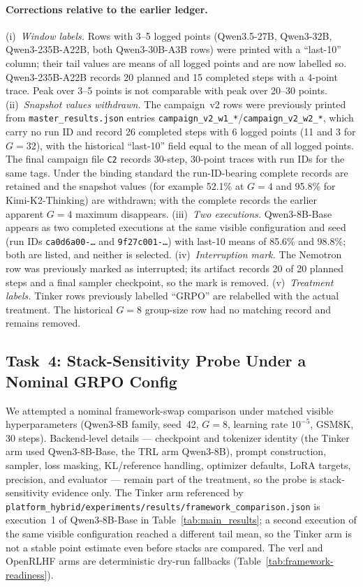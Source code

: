 \documentclass{article}
\begin{document}
\paragraph{Corrections relative to the earlier ledger.}
(i)~\emph{Window labels.} Rows with 3--5 logged points (Qwen3.5-27B,
Qwen3-32B, Qwen3-235B-A22B, both Qwen3-30B-A3B rows) were printed with a
``last-10'' column; their tail values are means of all logged points and are
now labelled so. Qwen3-235B-A22B records 20 planned and 15 completed steps
with a 4-point trace. Peak over 3--5 points is not comparable with peak over
20--30 points. (ii)~\emph{Snapshot values withdrawn.} The campaign~v2 rows were
previously printed from \texttt{master\_results.json} entries
\texttt{campaign\_v2\_w1\_*}/\texttt{campaign\_v2\_w2\_*}, which carry no run
ID and record 26 completed steps with 6 logged points (11 and 3 for $G=32$),
with the historical ``last-10'' field equal to the mean of all logged points.
The final campaign file \texttt{C2} records 30-step, 30-point traces with run
IDs for the same tags. Under the binding standard the run-ID-bearing complete
records are retained and the snapshot values (for example 52.1\% at $G=4$ and
95.8\% for Kimi-K2-Thinking) are withdrawn; with the complete records the
earlier apparent $G=4$ maximum disappears. (iii)~\emph{Two executions.}
Qwen3-8B-Base appears as two completed executions at the same visible
configuration and seed (run IDs \texttt{ca0d6a00-\dots} and
\texttt{9f27c001-\dots}) with last-10 means of 85.6\% and 98.8\%; both are
listed, and neither is selected. (iv)~\emph{Interruption mark.} The
Nemotron row was previously marked as interrupted; its artifact records 20 of
20 planned steps and a final sampler checkpoint, so the mark is removed.
(v)~\emph{Treatment labels.} Tinker rows previously labelled ``GRPO'' are
relabelled with the actual treatment. The historical $G=8$ group-size row had
no matching record and remains removed.

\subsection{Task~4: Stack-Sensitivity Probe Under a Nominal GRPO Config}
\label{sec:framework_gap}

We attempted a nominal framework-swap comparison under matched visible
hyperparameters (Qwen3-8B family, seed~42, $G=8$, learning rate $10^{-5}$,
GSM8K, 30 steps). Backend-level details --- checkpoint and tokenizer identity
(the Tinker arm used Qwen3-8B-Base, the TRL arm Qwen3-8B), prompt construction,
sampler, loss masking, KL/reference handling, optimizer defaults, LoRA targets,
precision, and evaluator --- remain part of the treatment, so the probe is
stack-sensitivity evidence only. The Tinker arm referenced by
\texttt{platform\_hybrid/experiments/results/framework\_comparison.json} is
execution~1 of Qwen3-8B-Base in Table~\ref{tab:main_results}; a second
execution of the same visible configuration reached a different tail mean, so
the Tinker arm is not a stable point estimate even before stacks are compared.
The verl and OpenRLHF arms are deterministic dry-run fallbacks
(Table~\ref{tab:framework-readiness}).
\end{document}
